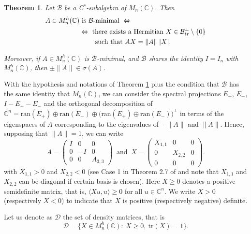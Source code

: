 \documentclass[12pt,a4paper]{article}
\def\calD{\mathcal D}
\def\C{\mathbb C}
\def\tr{\text{tr}}
\newtheorem{theorem}{Theorem}
\numberwithin{equation}{section}
\begin{document}
\begin{theorem}\label{teo X mod}
Let $\mathcal{B}$ be a C$^*$-subalgebra of $M_n(\C)$.  Then
\begin{equation}
	\begin{split}
		A\in M_n^h(\C)& \text{ is } \mathcal{B}\text{-minimal } \Leftrightarrow \\
		&\Leftrightarrow 
		\text{ there exists a Hermitian } X \in \mathcal{B}_{\tr}^\perp\setminus\{0\} \\
		&\hskip.7cm\text{ such that } A X =\|A\|\ |X|.
	\end{split}
\end{equation}

Moreover, if $A \in M_n^h(\C)$ is $\mathcal{B}$-minimal, and $\mathcal{B}$
shares the identity $I=I_n$ with $M_n^h(\C)$,
 then $\pm \|A\| \in \sigma(A)$.
\end{theorem}
With the hypothesis and notations of Theorem \ref{teo X mod} plus the condition that $\mathcal{B}$ has the same identity that $M_n(\C)$, we can consider the spectral projections $E_+$, $E_-$, $I-E_+-E_-$ and the orthogonal decomposition of $\C^n=\text{ran}(E_+)\oplus \text{ran}(E_-)\oplus \big(\text{ran}(E_+)\oplus \text{ran}(E_-)\big)^\perp$ in terms of the eigenspaces of $A$ corresponding to the eigenvalues of $-\|A\|$ and $\|A\|$. Hence, supposing that $\|A\|=1$, we can write  
\begin{equation}
	\label{equ A y X en descomp ortog de A}
A=\begin{pmatrix}
	I&0&0\\
	0&-I&0\\
	0&0&A_{3,3} 
\end{pmatrix}
\ \text{ and }\
X=\begin{pmatrix}
	X_{1,1}&0&0\\
	0&X_{2,2}&0\\
	0&0&0
\end{pmatrix}.
\end{equation}
with $X_{1,1}> 0$ and $X_{2,2}< 0$ (see  Case 1 in Theorem 2.7 of \cite{zhang-jiang-han-matrices} and note that $X_{1,1}$ and $X_{2,2}$ can be diagonal if certain basis is chosen). 
Here $X \ge 0$ denotes a positive semidefinite matrix, that is, $\langle Xu,u\rangle \ge 0$ for all $u \in \mathbb{C}^n$. We write $X > 0$ (respectively $X < 0$) to indicate that $X$ is positive (respectively negative) definite.

Let us denote as $\calD$ the set of density matrices, that is
	\[\calD=\{X\in M_n^h(\C):\ X\geq 0,\ \tr(X)=1 \}.
	\]
\end{document}
